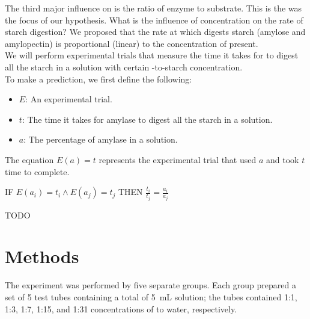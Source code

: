 \documentclass{article}
\begin{document}

The third major influence on \aamylase is the ratio of enzyme to substrate. This is the was the
focus of our hypothesis. What is the influence of \aamylase concentration on the rate of
starch digestion? We proposed that the rate at which \aamylase digests starch (amylose and
amylopectin) is proportional (linear) to the concentration of \aamylase present. \\

We will perform experimental trials that measure the time it takes for \aamylase to digest all
the starch in a solution with certain \aamylasens-to-starch concentration. \\

To make a prediction, we first define the following:
\begin{itemize}
    \item $E$: An experimental trial.
    \item $t$: The time it takes for amylase to digest all the starch in a solution.
    \item $a$: The percentage of amylase in a solution.
\end{itemize}

The equation $E(a) = t$ represents the experimental trial that used $a$ and took $t$ time to complete.

\begin{center}
    IF
        $E(a_{i}) = t_i \wedge E(a_{j}) = t_j$
    THEN
        $\frac{t_{i}}{t_{j}} = \frac{a_{i}}{a_{j}}$
\end{center}

TODO \\

\section{Methods}
\label{sec:methods}

The experiment was performed by five separate groups. Each group prepared a set of 5 test tubes
containing a total of \SI{5}{mL} solution; the tubes contained 1:1, 1:3, 1:7, 1:15, and 1:31
concentrations of \aamylase to water, respectively. \\
\end{document}
